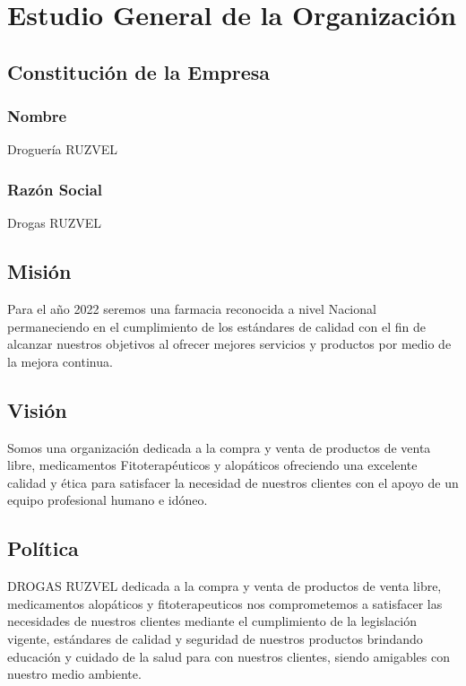 \chapter{Estudio General de la Organizaci\'on}
\section{Constituci\'on de la Empresa}
\subsection*{Nombre}
Droguería RUZVEL
\subsection*{Raz\'on Social}
Drogas RUZVEL

\section{Misi\'on}
Para el año 2022 seremos una farmacia reconocida a nivel Nacional permaneciendo en el cumplimiento de los estándares de calidad con el fin de alcanzar nuestros objetivos al ofrecer mejores  servicios  y productos  por medio de la mejora continua.

\section{Visi\'on}
Somos una organización dedicada a la compra y venta de productos de venta libre,  medicamentos Fitoterapéuticos y  alopáticos ofreciendo una excelente calidad y ética para satisfacer la necesidad de nuestros clientes con el apoyo de un equipo profesional humano e idóneo.

\section{Pol\'itica}
DROGAS RUZVEL dedicada a la compra y venta de productos de venta libre,  medicamentos alopáticos y fitoterapeuticos nos comprometemos a satisfacer las necesidades de nuestros clientes mediante el cumplimiento de la legislación vigente, estándares de calidad y seguridad de nuestros productos brindando  educación y cuidado de la salud  para con nuestros clientes, siendo amigables con nuestro medio ambiente. 

